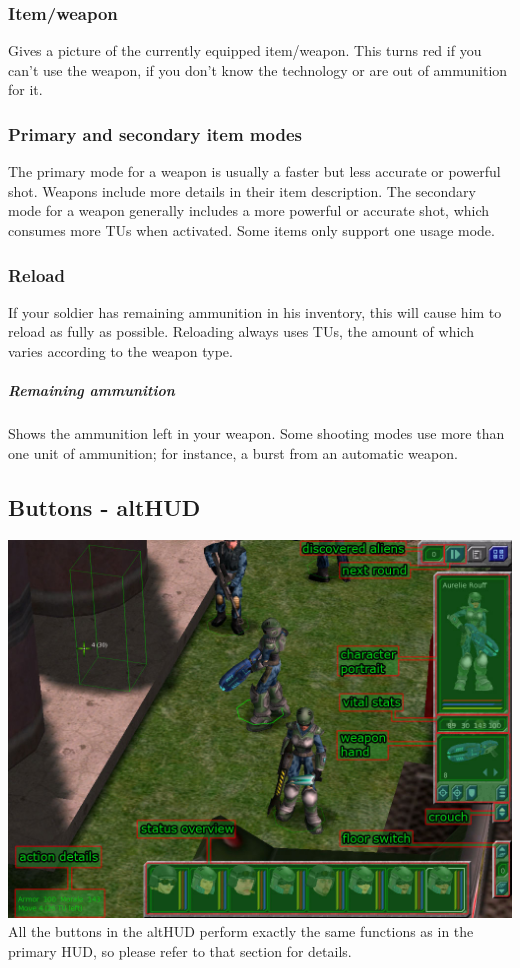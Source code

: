 \subsubsection{Item/weapon}
Gives a picture of the currently equipped item/weapon. This turns red if you can't use the weapon, if you don't know the technology or are out of ammunition for it.

\subsubsection{Primary and secondary item modes}
The primary mode for a weapon is usually a faster but less accurate or powerful shot. Weapons include more details in their item description.  The secondary mode for a weapon generally includes a more powerful or accurate shot, which consumes more TUs when activated.  Some items only support one usage mode.

\subsubsection{Reload}
If your soldier has remaining ammunition in his inventory, this will cause him to reload as fully as possible. Reloading always uses TUs, the amount of which varies according to the weapon type.

\subparagraph{Remaining ammunition}
Shows the ammunition left in your weapon. Some shooting modes use more than one unit of ammunition; for instance, a burst from an automatic weapon.

\subsection{Buttons - altHUD}

\includegraphics[width=\textwidth]{images/altHUD_final.jpg}\\

All the buttons in the altHUD perform exactly the same functions as in the primary HUD, so please refer to that section for details.
